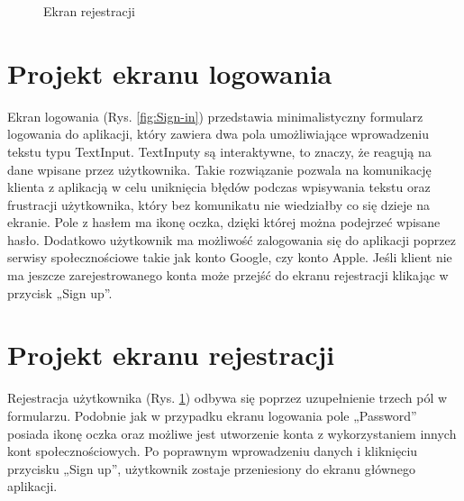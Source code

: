 \begin{figure}[t]
\begin{minipage}{0.4\textwidth}
		\caption{Ekran rejestracji}
		\label{fig:Sign-up}
	\end{minipage}
\end{figure}

\section*{Projekt ekranu logowania}
Ekran logowania (Rys. \ref{fig:Sign-in}) przedstawia minimalistyczny formularz logowania do aplikacji, który zawiera dwa pola umożliwiające wprowadzeniu tekstu typu TextInput. TextInputy są interaktywne, to znaczy, że reagują na dane wpisane przez użytkownika. Takie rozwiązanie pozwala na komunikację klienta z aplikacją w celu uniknięcia błędów podczas wpisywania tekstu oraz frustracji użytkownika, który bez komunikatu nie wiedziałby co się dzieje na ekranie. Pole z hasłem ma ikonę oczka, dzięki której można podejrzeć wpisane hasło. Dodatkowo użytkownik ma możliwość zalogowania się do aplikacji poprzez serwisy społecznościowe takie jak konto Google, czy konto Apple. Jeśli klient nie ma jeszcze zarejestrowanego konta może przejść do ekranu rejestracji klikając w przycisk „Sign up”.

\section*{Projekt ekranu rejestracji}
Rejestracja użytkownika (Rys. \ref{fig:Sign-up}) odbywa się poprzez uzupełnienie trzech pól w formularzu. Podobnie jak w przypadku ekranu logowania pole „Password” posiada ikonę oczka oraz możliwe jest utworzenie konta z wykorzystaniem innych kont społecznościowych. Po poprawnym wprowadzeniu danych i kliknięciu przycisku „Sign up”, użytkownik zostaje
przeniesiony do ekranu głównego aplikacji.

